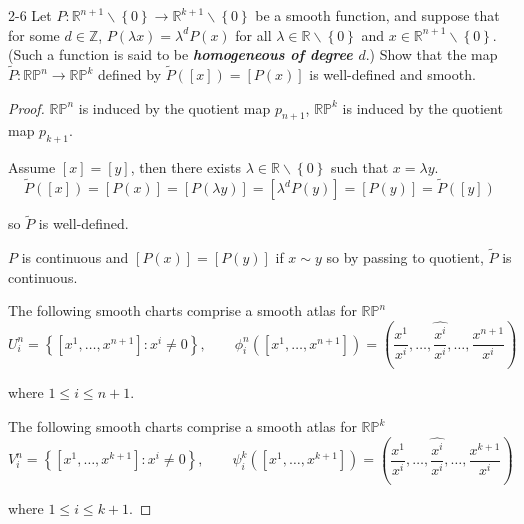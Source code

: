 \begin{problem}{2-6}
    Let \( P: \mathbb{R}^{n+1} \smallsetminus \left\{0 \right\} \to \mathbb{R}^{k+1} \smallsetminus \left\{0\right\} \) be a smooth function, and suppose that for some \( d \in \mathbb{Z} \), \( P(\lambda x) = \lambda^{d} P(x) \) for all \( \lambda \in \mathbb{R} \smallsetminus \left\{ 0 \right\} \) and \( x \in \mathbb{R}^{n+1} \smallsetminus \left\{0\right\} \). (Such a function is said to be \textbf{\emph{homogeneous of degree \(d\)}}.) Show that the map \( \widetilde{P}: \mathbb{RP}^{n} \to \mathbb{RP}^{k} \) defined by \( \widetilde{P}([x]) = [P(x)] \) is well-defined and smooth.
\end{problem}

\begin{proof}
    \( \mathbb{RP}^{n} \) is induced by the quotient map \( p_{n+1} \), \( \mathbb{RP}^{k} \) is induced by the quotient map \( p_{k+1} \).

    Assume \( [x] = [y] \), then there exists \( \lambda \in \mathbb{R} \smallsetminus \left\{ 0 \right\} \) such that \( x = \lambda y \).
    \[
        \widetilde{P}([x]) = [P(x)] = [P(\lambda y)] = [\lambda^{d} P(y)] = [P(y)] = \widetilde{P}([y])
    \]

    so \( \widetilde{P} \) is well-defined.

    \( P \) is continuous and \( [P(x)] = [P(y)] \) if \( x \sim y \) so by passing to quotient, \( \widetilde{P} \) is continuous.

    The following smooth charts comprise a smooth atlas for \( \mathbb{RP}^{n} \)
    \[
        U_{i}^{n} = \left\{ [x^{1}, \ldots, x^{n+1}]: x^{i} \ne 0 \right\}, \qquad \phi_{i}^{n}([x^{1}, \ldots, x^{n+1}]) = \left( \dfrac{x^{1}}{x^{i}}, \ldots, \widehat{\dfrac{x^{i}}{x^{i}}}, \ldots, \dfrac{x^{n+1}}{x^{i}} \right)
    \]

    where \( 1 \le i \le n + 1 \).

    The following smooth charts comprise a smooth atlas for \( \mathbb{RP}^{k} \)
    \[
        V_{i}^{n} = \left\{ [x^{1}, \ldots, x^{k+1}]: x^{i} \ne 0 \right\}, \qquad \psi_{i}^{k}([x^{1}, \ldots, x^{k+1}]) = \left( \dfrac{x^{1}}{x^{i}}, \ldots, \widehat{\dfrac{x^{i}}{x^{i}}}, \ldots, \dfrac{x^{k+1}}{x^{i}} \right)
    \]

    where \( 1 \le i \le k + 1 \).


\end{proof}
